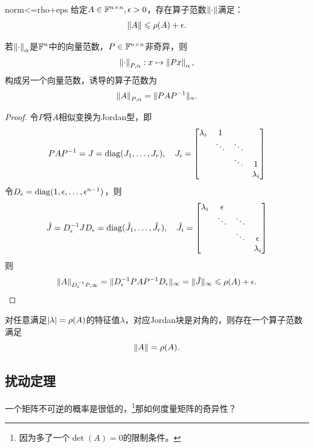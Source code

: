 \begin{theorem}
    {}{norm<=rho+eps}
    给定$A\in\mathbb F^{n\times n},\epsilon>0$，存在算子范数$\left\lVert\cdot\right\rVert$满足：
    \begin{equation}
        \left\lVert A\right\rVert\leqslant\rho(A)+\epsilon.
    \end{equation}
\end{theorem}

\begin{lemma}
    若$\left\lVert\cdot\right\rVert_\alpha$是$\mathbb F^n$中的向量范数，$P\in\mathbb F^{n\times n}$非奇异，则
    \[
        \left\lVert\cdot\right\rVert_{P,\alpha}:x\mapsto\left\lVert Px\right\rVert_\alpha,
    \]
    构成另一个向量范数，诱导的算子范数为
    \[
        \left\lVert A\right\rVert_{P,\alpha}=\lVert PAP^{-1}\rVert_\alpha.
    \]
\end{lemma}

\begin{proof}
    令$P$将$A$相似变换为Jordan型，即
    \[
        PAP^{-1}=J=\operatorname{diag}(J_1,\ldots,J_r),\quad J_i=\begin{bmatrix}
            \lambda_i&1\\
            &\ddots&\ddots\\
            &&\ddots&1\\
            &&&\lambda_i
        \end{bmatrix}
    \]
    令$D_\epsilon=\operatorname{diag}(1,\epsilon,\ldots,\epsilon^{n-1})$，则 
    \[
        \hat J=D_\epsilon^{-1} JD_\epsilon=\operatorname{diag}(\hat J_1,\ldots,\hat J_r),\quad\hat J_i=\begin{bmatrix}
            \lambda_i&\epsilon\\
            &\ddots&\ddots\\
            &&\ddots&\epsilon\\
            &&&\lambda_i
        \end{bmatrix}
    \]
    则
    \[
        \left\lVert A\right\rVert_{D_\epsilon^{-1} P,\infty}=\lVert D_\epsilon^{-1} PAP^{-1} D_\epsilon\rVert_\infty=\lVert\hat J\rVert_\infty\leqslant\rho(A)+\epsilon.
        \qedhere
    \]
\end{proof}

\begin{remark}
    对任意满足$\left\lvert\lambda\right\rvert=\rho(A)$的特征值$\lambda$，对应Jordan块是对角的，则存在一个算子范数满足
    \[
        \left\lVert A\right\rVert=\rho(A).
    \]
\end{remark}

\subsection{扰动定理}

一个矩阵不可逆的概率是很低的，\footnote{因为多了一个$\det(A)=0$的限制条件。}那如何度量矩阵的奇异性？%

